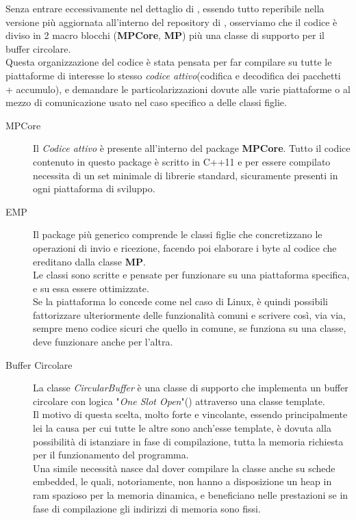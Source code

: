 \noindent
Senza entrare eccessivamente nel dettaglio di , essendo tutto reperibile nella versione più aggiornata all'interno del repository di \cite*{EMP}, osserviamo che il codice è diviso in 2 macro blocchi (\textbf{MPCore}, \textbf{MP}) più una classe di supporto per il buffer circolare.\\
Questa organizzazione del codice è stata pensata per far compilare su tutte le piattaforme di interesse lo stesso \textit{codice attivo}(codifica e decodifica dei pacchetti + accumulo), e demandare le particolarizzazioni dovute alle varie piattaforme o al mezzo di comunicazione usato nel caso specifico a delle classi figlie.\\
\begin{spacing}{1.25}
	\begin{description}
		\item[MPCore] Il \textit{Codice attivo} è presente all'interno del package \textbf{MPCore}. Tutto il codice contenuto in questo package è scritto in C++11 e per essere compilato necessita di un set minimale di librerie standard, sicuramente presenti in ogni piattaforma di sviluppo.
		\item[EMP] Il package più generico comprende le classi figlie che concretizzano le operazioni di invio e ricezione, facendo poi elaborare i byte al codice che ereditano dalla classe \textbf{MP}.\\
		      Le classi sono scritte e pensate per funzionare su una piattaforma specifica, e su essa essere ottimizzate.\\
		      Se la piattaforma lo concede come nel caso di Linux, è quindi possibili fattorizzare ulteriormente delle funzionalità comuni e scrivere così, via via, sempre meno codice sicuri che quello in comune, se funziona su una classe, deve funzionare anche per l'altra.
		\item[Buffer Circolare] La classe \textit{CircularBuffer} è una classe di supporto che implementa un buffer circolare con logica "\textit{One Slot Open}"(\cite{CircularBuffer}) attraverso una classe template.\\
		      Il motivo di questa scelta, molto forte e vincolante, essendo principalmente lei la causa per cui tutte le altre sono anch'esse template, è dovuta alla possibilità di istanziare in fase di compilazione, tutta la memoria richiesta per il funzionamento del programma.\\
		      Una simile necessità nasce dal dover compilare la classe anche su schede embedded, le quali, notoriamente, non hanno a disposizione un heap in ram spazioso per la memoria dinamica, e beneficiano nelle prestazioni se in fase di compilazione gli indirizzi di memoria sono fissi.
	\end{description}
\end{spacing}

